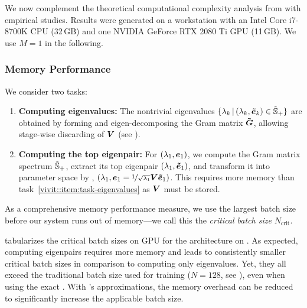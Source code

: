 We now complement the theoretical computational complexity analysis from
 with empirical studies. Results were generated on a
workstation with an Intel Core i7-8700K CPU (32\,GB) and one NVIDIA GeForce RTX
2080 Ti GPU (11\,GB). We use $M=1$ in the following.





\subsubsection{Memory Performance}

We consider two tasks:
\begin{enumerate}
\item \textbf{Computing eigenvalues:} The nontrivial eigenvalues
  $\{\lambda_{k}\,|\, (\lambda_{k}, \bm{\tilde{e}}_{k}) \in \tilde{{\mathbb{S}}}_+\}$ are
  obtained by forming and eigen-decomposing the Gram matrix $\bm{\tilde{{\bm{G}}}}$, allowing
  stage-wise discarding of ${\bm{V}}$ (see
  ).
  \label{vivit::item:task-eigenvalues}

\item \textbf{Computing the top eigenpair:} For $(\lambda_{1}, {\bm{e}}_{1})$, we
  compute the Gram matrix spectrum $\tilde{{\mathbb{S}}}_{+}$, extract its top eigenpair
  $(\lambda_{1}, \bm{\tilde{e}}_{1})$, and transform it into parameter space by
  , \ie $(\lambda_{1}, {\bm{e}}_{1} =
  \nicefrac{1}{\sqrt{\lambda_{1}}} {\bm{V}} \bm{\tilde{e}}_{1} )$. This requires more
  memory than task~\ref{vivit::item:task-eigenvalues} as ${\bm{V}}$ must be stored.
  \label{vivit::item:task-eigenvectors}
\end{enumerate}
As a comprehensive memory performance measure, we use the largest batch size
before our system runs out of memory---we call this the \emph{critical batch size}
$N_{\text{crit}}$.

 tabularizes the critical batch
sizes on GPU for the \threecthreed architecture on \cifarten. As expected,
computing eigenpairs requires more memory and leads to consistently smaller
critical batch sizes in comparison to computing only eigenvalues. Yet, they all
exceed the traditional batch size used for training ($N=128$, see
\cite{schneider2019deepobs}), even when using the exact \ggn. With \vivit{}'s
approximations, the memory overhead can be reduced to significantly increase the
applicable batch size.

